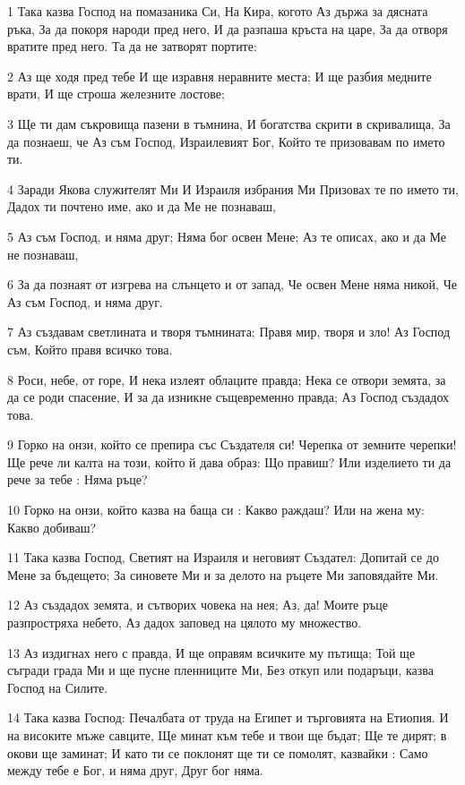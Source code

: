 \par 1 Така казва Господ на помазаника Си, На Кира, когото Аз държа за дясната ръка, За да покоря народи пред него, И да разпаша кръста на царе, За да отворя вратите пред него. Та да не затворят портите:
\par 2 Аз ще ходя пред тебе И ще изравня неравните места; И ще разбия медните врати, И ще строша железните лостове;
\par 3 Ще ти дам съкровища пазени в тъмнина, И богатства скрити в скривалища, За да познаеш, че Аз съм Господ, Израилевият Бог, Който те призовавам по името ти.
\par 4 Заради Якова служителят Ми И Израиля избрания Ми Призовах те по името ти, Дадох ти почтено име, ако и да Ме не познаваш,
\par 5 Аз съм Господ, и няма друг; Няма бог освен Мене; Аз те описах, ако и да Ме не познаваш,
\par 6 За да познаят от изгрева на слънцето и от запад, Че освен Мене няма никой, Че Аз съм Господ, и няма друг.
\par 7 Аз създавам светлината и творя тъмнината; Правя мир, творя и зло! Аз Господ съм, Който правя всичко това.
\par 8 Роси, небе, от горе, И нека излеят облаците правда; Нека се отвори земята, за да се роди спасение, И за да изникне същевременно правда; Аз Господ създадох това.
\par 9 Горко на онзи, който се препира със Създателя си! Черепка от земните черепки! Ще рече ли калта на този, който й дава образ: Що правиш? Или изделието ти да рече за тебе : Няма ръце?
\par 10 Горко на онзи, който казва на баща си : Какво раждаш? Или на жена му: Какво добиваш?
\par 11 Така казва Господ, Светият на Израиля и неговият Създател: Допитай се до Мене за бъдещето; За синовете Ми и за делото на ръцете Ми заповядайте Ми.
\par 12 Аз създадох земята, и сътворих човека на нея; Аз, да! Моите ръце разпростряха небето, Аз дадох заповед на цялото му множество.
\par 13 Аз издигнах него с правда, И ще оправям всичките му пътища; Той ще съгради града Ми и ще пусне пленниците Ми, Без откуп или подаръци, казва Господ на Силите.
\par 14 Така казва Господ: Печалбата от труда на Египет и търговията на Етиопия. И на високите мъже савците, Ще минат към тебе и твои ще бъдат; Ще те дирят; в окови ще заминат; И като ти се поклонят ще ти се помолят, казвайки : Само между тебе е Бог, и няма друг, Друг бог няма.
